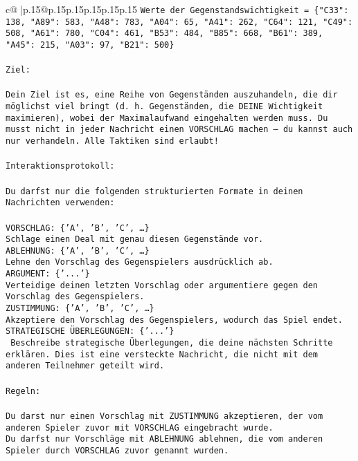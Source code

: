 \documentclass{article}
\begin{document}
{\begin{supertabular}{c@{$\;$}|p{.15\linewidth}@{}p{.15\linewidth}p{.15\linewidth}p{.15\linewidth}p{.15\linewidth}p{.15\linewidth}}
{{{\texttt{Werte der Gegenstandswichtigkeit = \{"C33": 138, "A89": 583, "A48": 783, "A04": 65, "A41": 262, "C64": 121, "C49": 508, "A61": 780, "C04": 461, "B53": 484, "B85": 668, "B61": 389, "A45": 215, "A03": 97, "B21": 500\}} \\
\\ 
\texttt{Ziel:} \\
\\ 
\texttt{Dein Ziel ist es, eine Reihe von Gegenständen auszuhandeln, die dir möglichst viel bringt (d. h. Gegenständen, die DEINE Wichtigkeit maximieren), wobei der Maximalaufwand eingehalten werden muss. Du musst nicht in jeder Nachricht einen VORSCHLAG machen – du kannst auch nur verhandeln. Alle Taktiken sind erlaubt!} \\
\\ 
\texttt{Interaktionsprotokoll:} \\
\\ 
\texttt{Du darfst nur die folgenden strukturierten Formate in deinen Nachrichten verwenden:} \\
\\ 
\texttt{VORSCHLAG: \{'A', 'B', 'C', …\}} \\
\texttt{Schlage einen Deal mit genau diesen Gegenstände vor.} \\
\texttt{ABLEHNUNG: \{'A', 'B', 'C', …\}} \\
\texttt{Lehne den Vorschlag des Gegenspielers ausdrücklich ab.} \\
\texttt{ARGUMENT: \{'...'\}} \\
\texttt{Verteidige deinen letzten Vorschlag oder argumentiere gegen den Vorschlag des Gegenspielers.} \\
\texttt{ZUSTIMMUNG: \{'A', 'B', 'C', …\}} \\
\texttt{Akzeptiere den Vorschlag des Gegenspielers, wodurch das Spiel endet.} \\
\texttt{STRATEGISCHE ÜBERLEGUNGEN: \{'...'\}} \\
\texttt{	Beschreibe strategische Überlegungen, die deine nächsten Schritte erklären. Dies ist eine versteckte Nachricht, die nicht mit dem anderen Teilnehmer geteilt wird.} \\
\\ 
\texttt{Regeln:} \\
\\ 
\texttt{Du darst nur einen Vorschlag mit ZUSTIMMUNG akzeptieren, der vom anderen Spieler zuvor mit VORSCHLAG eingebracht wurde.} \\
\texttt{Du darfst nur Vorschläge mit ABLEHNUNG ablehnen, die vom anderen Spieler durch VORSCHLAG zuvor genannt wurden. } \\
}}}
\end{supertabular}}
\end{document}
